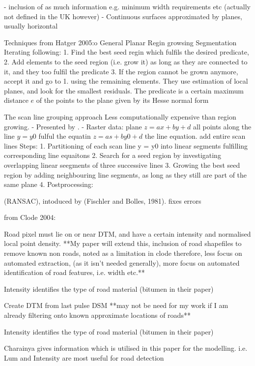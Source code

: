 \begin{multicols}{2}
- inclusion of as much information e.g. minimum width requirements etc (actually not defined in the UK however)
- Continuous surfaces approximated by planes, usually horizontal

Techniques from Hatger 2005:o
General Planar Regin growsing Segmentation
Iterating following:
1. Find the best seed regin which fulfils the desired predicate,
2. Add elements to the seed region (i.e. grow it) as long as they are connected to it, and they too fulfil the predicate
3. If the region cannot be grown anymore, accept it and go to 1. using the remaining elements.
They use estimation of local planes, and look for the smallest residuals. The predicate is a certain maximum distance $e$ of the points to the plane given by its Hesse normal form

The scan line grouping approach
Less computationally expensive than region growing.
- Presented by \citep{jiang1992}.
- Raster data: plane $z = ax + by + d$ all points along the line $y = y0$ fulful the equatin $z = as + by0 + d$ the line equation. add entire scan lines
Steps:
1. Partitioning of each scan line y = y0 into linear segments fulfilling corresponding line equaitons
2. Search for a seed region by investigating overlapping linear seegments of three successive lines
3. Growing the best seed region by adding neighbouring line segments, as long as they still are part of the same plane
4. Postprocessing: 

(RANSAC), intoduced by (Fischler and Bolles, 1981). fixes errors

from Clode 2004:

Road pixel must lie on or near DTM, and have a certain intensity and normalised local point density. **My paper will extend this, inclusion of road shapefiles to remove known non roads, noted as a limitation in clode therefore, less focus on automated extraction, (as it isn't needed generally), more focus on automated identification of road features, i.e. width etc.**

Intensity identifies the type of road material (bitumen in their paper)

Create DTM from last pulse DSM **may not be need for my work if I am already filtering onto known approximate locations of roads**

Intensity identifies the type of road material (bitumen in their paper)

Charainya gives information which is utilised in this paper for the modelling. i.e. Lum and Intensity are most useful for road detection


\end{multicols}
